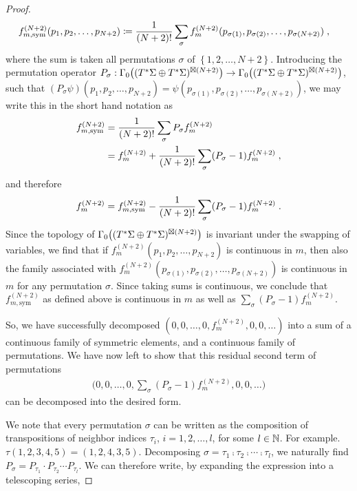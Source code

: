 \begin{proof}
\begin{align}
	f_{m,\text{sym}}^{(N+2)}(p_1,p_2,\dots,p_{N+2})
	&\coloneqq \frac{1}{(N+2)!} \sum\limits_\sigma f_m^{(N+2)} (p_{\sigma(1)},p_{\sigma(2)},\dots,p_{\sigma(N+2)}) \;,
\end{align}
where the sum is taken all permutations $\sigma$ of $\left\{ 1,2,\dots,N+2\right\}$. Introducing the permutation operator $P_\sigma : \Gamma_0\big( (T^*\Sigma \oplus T^*\Sigma)^{\boxtimes (N+2)} \big)  \to \Gamma_0\big( (T^*\Sigma \oplus T^*\Sigma)^{\boxtimes (N+2)} \big) $, such that $(P_\sigma \psi)(p_1,p_2,\dots,p_{N+2}) = \psi (p_{\sigma(1)},p_{\sigma(2)},\dots,p_{\sigma(N+2)}) $, we may write this in the short hand notation as
\begin{align}
f_{m,\text{sym}}^{(N+2)}
&=  \frac{1}{(N+2)!} \sum\limits_\sigma P_\sigma f_m^{(N+2)} \notag\\
&= f_{m}^{(N+2)} +\frac{1}{(N+2)!} \sum\limits_\sigma  (P_\sigma - 1) f_m^{(N+2)} \;,
\end{align}
and therefore
\begin{align}\label{eqn:symmetrization_of_field}
f_{m}^{(N+2)} = f_{m,\text{sym}}^{(N+2)} - \frac{1}{(N+2)!} \sum\limits_\sigma  (P_\sigma - 1) f_m^{(N+2)}  \;.
\end{align}
Since the topology of $\Gamma_0\big( (T^*\Sigma \oplus T^*\Sigma)^{\boxtimes (N+2)} \big) $ is invariant under the swapping of variables, we find that if $f_m^{(N+2)} (p_1,p_2,\dots,p_{N+2})$ is continuous in $m$, then also the family associated with $f_m^{(N+2)} (p_{\sigma(1)},p_{\sigma(2)},\dots,p_{\sigma(N+2)})$ is continuous in $m$ for any permutation $\sigma$. Since taking sums is continuous, we conclude that $f_{m,\text{sym}}^{(N+2)}$ as defined above is continuous in $m$ as well as $\sum_\sigma  (P_\sigma - 1) f_m^{(N+2)}$. \par
So, we have successfully decomposed $(0,0,\dots,0,f_m^{(N+2)},0,0,\dots)$ into a sum of a continuous family of symmetric elements, and a continuous family of permutations. We have now left to show that this residual second term of permutations
\begin{align}\label{eqn:permuted_homogenous_element}
	\big(0,0,\dots,0,\sum_\sigma  (P_\sigma - 1) f_m^{(N+2)},0,0,\dots \big)
\end{align}
can be decomposed into the desired form.\par
We note that every permutation $\sigma$ can be written as the composition of transpositions of neighbor indices $\tau_i$, $i=1,2,\dots,l$, for some $l \in \mathbb{N}$. For example. $\tau(1,2,3,4,5) = (1,2,4,3,5)$. Decomposing $\sigma = \tau_1 \comp \tau_2 \comp \cdots \comp \tau_l$, we naturally find $P_\sigma = P_{\tau_1}\cdot P_{\tau_2}\cdots P_{\tau_l}$. We can therefore write, by expanding the expression into a telescoping series,

\end{proof}
